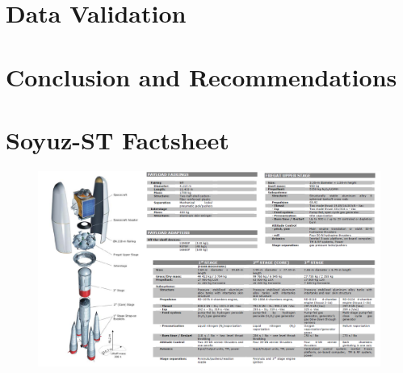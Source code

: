 \documentclass[11pt]{report}
\begin{document}
\chapter{Data Validation}
\label{chap:sim}





%
%






%
%



%
%

\chapter{Conclusion and Recommendations}


%
%




%
%

\appendix
\chapter{Soyuz-ST Factsheet}
\label{appa}
\begin{figure}[ht]
\centering
\includegraphics[scale = 0.4, angle=270]{chapters/img/soyuzfact.png}
\label{fig:soyuzfact}

\end{figure}

\newpage


\newpage


\newpage


\newpage

\end{document}
